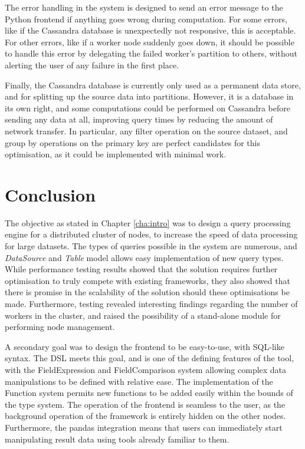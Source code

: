 The error handling in the system is designed to send an error message to the Python frontend if anything goes wrong during computation. For some errors, like if the Cassandra database is unexpectedly not responsive, this is acceptable. For other errors, like if a worker node suddenly goes down, it should be possible to handle this error by delegating the failed worker's partition to others, without alerting the user of any failure in the first place.

Finally, the Cassandra database is currently only used as a permanent data store, and for splitting up the source data into partitions. However, it is a database in its own right, and some computations could be performed on Cassandra before sending any data at all, improving query times by reducing the amount of network transfer. In particular, any filter operation on the source dataset, and group by operations on the primary key are perfect candidates for this optimisation, as it could be implemented with minimal work.


\section{Conclusion}
The objective as stated in Chapter \ref{cha:intro} was to design a query processing engine for a distributed cluster of nodes, to increase the speed of data processing for large datasets. The types of queries possible in the system are numerous, and \textit{DataSource} and \textit{Table} model allows easy implementation of new query types. While performance testing results showed that the solution requires further optimisation to truly compete with existing frameworks, they also showed that there is promise in the scalability of the solution should these optimisations be made. Furthermore, testing revealed interesting findings regarding the number of workers in the cluster, and raised the possibility of a stand-alone module for performing node management. 

A secondary goal was to design the frontend to be easy-to-use, with SQL-like syntax. The DSL meets this goal, and is one of the defining features of the tool, with the FieldExpression and FieldComparison system allowing complex data manipulations to be defined with relative ease. The implementation of the Function system permits new functions to be added easily within the bounds of the type system. The operation of the frontend is seamless to the user, as the background operation of the framework is entirely hidden on the other nodes. Furthermore, the pandas integration means that users can immediately start manipulating result data using tools already familiar to them.